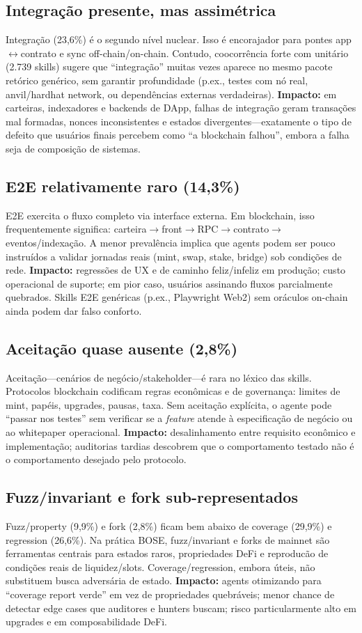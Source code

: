 \documentclass[10pt,conference]{IEEEtran}
\begin{document}
\subsection{Integração presente, mas assimétrica}
Integração (23,6\%) é o segundo nível nuclear.
Isso é encorajador para pontes app$\leftrightarrow$contrato e sync off-chain/on-chain.
Contudo, coocorrência forte com unitário (2.739 skills) sugere que ``integração'' muitas vezes aparece no mesmo pacote retórico genérico, sem garantir profundidade (p.ex., testes com nó real, anvil/hardhat network, ou dependências externas verdadeiras).
\textbf{Impacto:} em carteiras, indexadores e backends de DApp, falhas de integração geram transações mal formadas, nonces inconsistentes e estados divergentes---exatamente o tipo de defeito que usuários finais percebem como ``a blockchain falhou'', embora a falha seja de composição de sistemas.

\subsection{E2E relativamente raro (14,3\%)}
E2E exercita o fluxo completo via interface externa.
Em blockchain, isso frequentemente significa: carteira$\rightarrow$front$\rightarrow$RPC$\rightarrow$contrato$\rightarrow$eventos/indexação.
A menor prevalência implica que agents podem ser pouco instruídos a validar jornadas reais (mint, swap, stake, bridge) sob condições de rede.
\textbf{Impacto:} regressões de UX e de caminho feliz/infeliz em produção; custo operacional de suporte; em pior caso, usuários assinando fluxos parcialmente quebrados.
Skills E2E genéricas (p.ex., Playwright Web2) sem oráculos on-chain ainda podem dar falso conforto.

\subsection{Aceitação quase ausente (2,8\%)}
Aceitação---cenários de negócio/stakeholder---é rara no léxico das skills.
Protocolos blockchain codificam regras econômicas e de governança: limites de mint, papéis, upgrades, pausas, taxa.
Sem aceitação explícita, o agente pode ``passar nos testes'' sem verificar se a \emph{feature} atende à especificação de negócio ou ao whitepaper operacional.
\textbf{Impacto:} desalinhamento entre requisito econômico e implementação; auditorias tardias descobrem que o comportamento testado não é o comportamento desejado pelo protocolo.

\subsection{Fuzz/invariant e fork sub-representados}
Fuzz/property (9,9\%) e fork (2,8\%) ficam bem abaixo de coverage (29,9\%) e regression (26,6\%).
Na prática BOSE, fuzz/invariant e forks de mainnet são ferramentas centrais para estados raros, propriedades DeFi e reproducão de condições reais de liquidez/slots.
Coverage/regression, embora úteis, não substituem busca adversária de estado.
\textbf{Impacto:} agents otimizando para ``coverage report verde'' em vez de propriedades quebráveis; menor chance de detectar edge cases que auditores e hunters buscam; risco particularmente alto em upgrades e em composabilidade DeFi.
\end{document}
